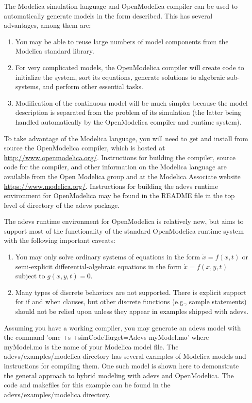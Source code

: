 The Modelica simulation language and OpenModelica compiler can be used to automatically generate models in the form described. This has several advantages, among them are:
\begin{enumerate}
\item You may be able to reuse large numbers of model components from the Modelica standard library.
\item For very complicated models, the OpenModelica compiler will create code to initialize the system, sort its equations, generate solutions to algebraic sub-systems, and perform other essential tasks.
\item Modification of the continuous model will be much simpler because the model description is separated from the problem of its simulation (the latter being handled automatically by the OpenModelica compiler and runtime system).
\end{enumerate}

To take advantage of the Modelica language, you will need to get and install from source the OpenModelica compiler, which is hosted at \url{http://www.openmodelica.org/}. Instructions for building the compiler, source code for the compiler, and other information on the Modelica language are available from the Open Modelica group and at the Modelica Associate website \url{https://www.modelica.org/}. Instructions for building the adevs runtime environment for OpenModelica may be found in the README file in the top level of directory of the adevs package.

The adevs runtime environment for OpenModelica is relatively new, but aims to support most of the functionality of the standard OpenModelica runtime system with the following important caveats:
\begin{enumerate}
\item You may only solve ordinary systems of equations in the form $\dot{x}=f(x,t)$ or semi-explicit differential-algebraic equations in the form $\dot{x}=f(x,y,t)$ subject to $g(x,y,t)=0$.
\item Many types of discrete behaviors are not supported. There is explicit support for if and when clauses, but other discrete functions (e.g., sample statements) should not be relied upon unless they appear in examples shipped with adevs.
\end{enumerate}

Assuming you have a working compiler, you may generate an adevs model with the command 'omc +s +simCodeTarget=Adevs myModel.mo' where myModel.mo is the name of your Modelica model file. The adevs/examples/modelica directory has several examples of Modelica models and instructions for compiling them. One such model is shown here to demonstrate the general approach to hybrid modeling with adevs and OpenModelica. The code and makefiles for this example can be found in the adevs/examples/modelica directory.

